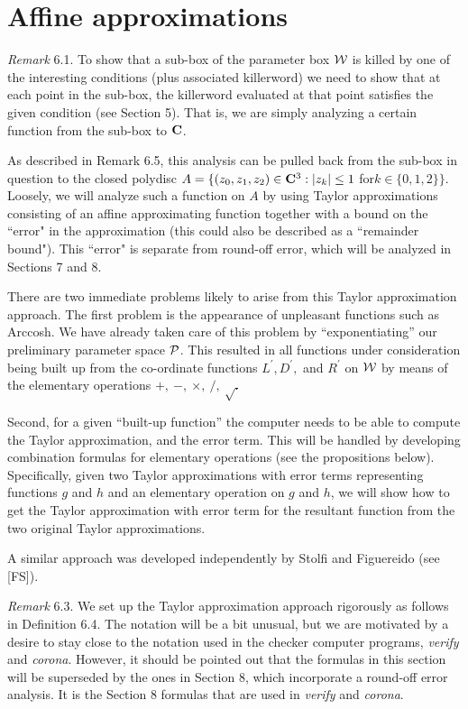 \section{Affine approximations}

 
{\it Remark} 6.1.
To show that a sub-box of the parameter box ${\cal W}$ is killed by one of the interesting conditions (plus associated killerword) we need to show that at each point in the sub-box, the killerword evaluated at that point satisfies the given condition (see
Section 5).  That is, we are simply analyzing a certain function from the sub-box to ${\bf C}$.  

As described in Remark 6.5, this analysis can be pulled back from the sub-box in question to the closed polydisc 
$A = \{(z_0,z_1,z_2) \in {\bf C}^3 : |z_k| \le 1$  for\break $k \in \{0,1,2\}\}.$  
Loosely,  we will analyze such a function on $A$ by using  Taylor approximations consisting of an affine approximating
function together with a bound on the ``error" in the approximation (this could also be described as a ``remainder bound").  This ``error" 
is separate from round-off error,  which will be analyzed in Sections 7 and 8.  

There are two immediate problems likely to arise from this Taylor approximation approach.
The first problem is the appearance of unpleasant functions such as 
Arccosh.  We have already taken care of this problem by ``exponentiating'' our preliminary parameter space ${\cal P}$.  This resulted in all functions under consideration being built up from the co-ordinate functions $ L^{\prime}, D^{\prime},$ and $ R^{\prime}$ on ${\cal W}$ by means of the elementary operations $+,\ -,\ \times,\ /,\ \sqrt.$ 

Second,  for a given ``built-up function'' the computer needs to be able to compute the Taylor approximation, and the error term.  This will be handled 
by developing combination formulas for elementary operations (see the propositions below).  Specifically, given two Taylor
approximations with error terms representing functions $g$ and $h$ and an elementary operation on $g$ and $h$, we will show how to
get the Taylor approximation with error term for the resultant function from the two original Taylor approximations. 

A similar approach was developed independently by Stolfi and Figuereido (see [FS]).
\enddemo

{\it Remark} 6.3.
We set up the Taylor approximation approach rigorously as follows in Definition 6.4.  The notation will be a bit unusual, but we are motivated by a desire to stay close to the notation used in the checker computer programs, {\it verify} and {\it corona}.  However, it should be pointed out that the formulas in this
section will be superseded by the ones in Section 8, which incorporate a round-off error analysis.  It is the Section 8 formulas that are
used in {\it verify} and {\it corona}.

